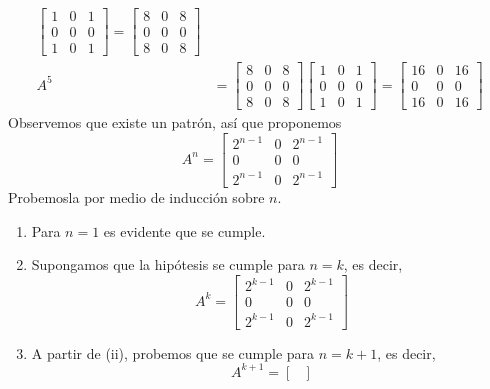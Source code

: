 \begin{example}
\begin{align*}
\begin{bmatrix}
            1 & 0 & 1 \\
            0 & 0 & 0 \\
            1 & 0 & 1
        \end{bmatrix} = \begin{bmatrix}
            8 & 0 & 8 \\
            0 & 0 & 0 \\
            8 & 0 & 8
        \end{bmatrix} \\
        A^5 & = \begin{bmatrix}
            8 & 0 & 8 \\
            0 & 0 & 0 \\
            8 & 0 & 8
        \end{bmatrix} \begin{bmatrix}
            1 & 0 & 1 \\
            0 & 0 & 0 \\
            1 & 0 & 1
        \end{bmatrix} = \begin{bmatrix}
            16 & 0 & 16 \\
            0 & 0 & 0 \\
            16 & 0 & 16
        \end{bmatrix}
    \end{align*}
    Observemos que existe un patrón, así que proponemos
    $$A^n = \begin{bmatrix}
        2^{n-1} & 0 & 2^{n-1} \\
        0 & 0 & 0 \\
        2^{n-1} & 0 & 2^{n-1}
    \end{bmatrix}$$
    Probemosla por medio de inducción sobre $n$.
    \begin{enumerate}[label=\roman*.]
        \item Para $n = 1$ es evidente que se cumple.
        \item Supongamos que la hipótesis se cumple para $n = k$, es decir,
        $$A^k = \begin{bmatrix}
            2^{k-1} & 0 & 2^{k-1} \\
            0 & 0 & 0 \\
            2^{k-1} & 0 & 2^{k-1}
        \end{bmatrix}$$
        \item A partir de (ii), probemos que se cumple para $n = k + 1$, es decir,
        $$A^{k+1} = \begin{bmatrix}

\end{bmatrix}$$
\end{enumerate}
\end{example}
